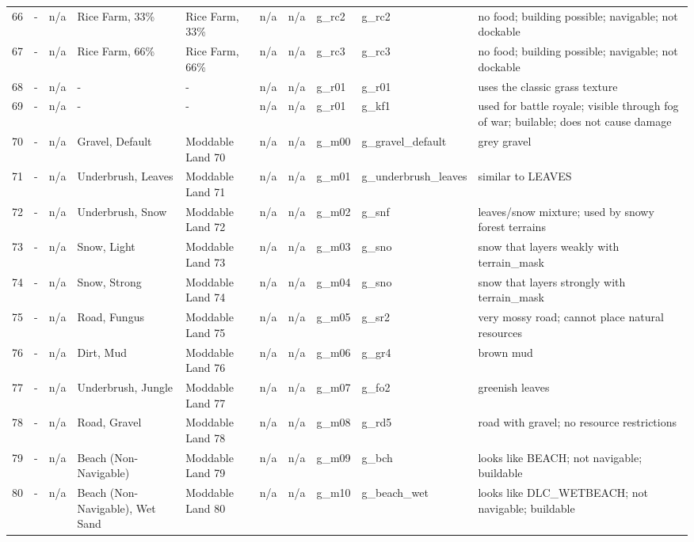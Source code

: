 \begin{landscape}
\begin{longtable}{@{}p{5mm}|p{25mm}p{23mm}|p{14mm}p{14mm}p{14mm}p{14mm}|p{10mm}p{15mm}|p{45mm}@{}}
            66	& -	& n/a	& Rice Farm, 33\%	& Rice Farm, 33\%	& n/a	& n/a	& g\_rc2	& g\_rc2		& no food; building possible; navigable; not dockable \\
            67	& -	& n/a	& Rice Farm, 66\%	& Rice Farm, 66\%	& n/a	& n/a	& g\_rc3	& g\_rc3		& no food; building possible; navigable; not dockable \\
            68	& -	& n/a	& -	& -	& n/a	& n/a	& g\_r01	& g\_r01		& uses the classic grass texture \\
            69	& -	& n/a	& -	& -	& n/a	& n/a	& g\_r01	& g\_kf1		& used for battle royale; visible through fog of war; builable; does not cause damage \\
            70	& -	& n/a	& Gravel, Default	& Moddable Land 70	& n/a	& n/a	& g\_m00	& g\_gravel\_default		& grey gravel \\
            71	& -	& n/a	& Underbrush, Leaves	& Moddable Land 71	& n/a	& n/a	& g\_m01	& g\_underbrush\_leaves		& similar to LEAVES \\
            72	& -	& n/a	& Underbrush, Snow	& Moddable Land 72	& n/a	& n/a	& g\_m02	& g\_snf		& leaves/snow mixture; used by snowy forest terrains \\
            73	& -	& n/a	& Snow, Light	& Moddable Land 73	& n/a	& n/a	& g\_m03	& g\_sno		& snow that layers weakly with terrain\_mask \\
            74	& -	& n/a	& Snow, Strong	& Moddable Land 74	& n/a	& n/a	& g\_m04	& g\_sno		& snow that layers strongly with terrain\_mask \\
            75	& -	& n/a	& Road, Fungus	& Moddable Land 75	& n/a	& n/a	& g\_m05	& g\_sr2		& very mossy road; cannot place natural resources \\
            76	& -	& n/a	& Dirt, Mud	& Moddable Land 76	& n/a	& n/a	& g\_m06	& g\_gr4		& brown mud \\
            77	& -	& n/a	& Underbrush, Jungle	& Moddable Land 77	& n/a	& n/a	& g\_m07	& g\_fo2		& greenish leaves \\
            78	& -	& n/a	& Road, Gravel	& Moddable Land 78	& n/a	& n/a	& g\_m08	& g\_rd5		& road with gravel; no resource restrictions \\
            79	& -	& n/a	& Beach (Non-Navigable)	& Moddable Land 79	& n/a	& n/a	& g\_m09	& g\_bch		& looks like BEACH; not navigable; buildable \\
            80	& -	& n/a	& Beach (Non-Navigable), Wet Sand	& Moddable Land 80	& n/a	& n/a	& g\_m10	& g\_beach\_wet		& looks like DLC\_WETBEACH; not navigable; buildable \\

\end{longtable}
\end{landscape}
